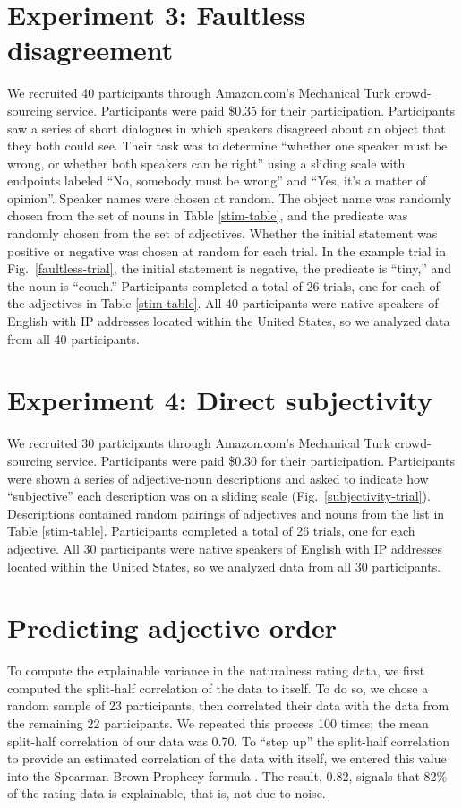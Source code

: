 \documentclass{pnastwo}
\begin{document}
\begin{article}
\begin{materials}
\section{Experiment 3: Faultless disagreement}
We recruited 40 participants through Amazon.com's Mechanical Turk crowd-sourcing service. Participants were paid \$0.35 for their participation. Participants saw a series of short dialogues in which speakers disagreed about an object that they both could see.  Their task was to determine ``whether one speaker must be wrong, or whether both speakers can be right'' using a sliding scale with endpoints labeled ``No, somebody must be wrong'' and ``Yes, it's a matter of opinion''. Speaker names were chosen at random. The object name was randomly chosen from the set of nouns in Table \ref{stim-table}, and the predicate was randomly chosen from the set of adjectives. Whether the initial statement was positive or negative was chosen at random for each trial. In the example trial in Fig.~\ref{faultless-trial}, the initial statement is negative, the predicate is ``tiny,'' and the noun is ``couch.'' Participants completed a total of 26 trials, one for each of the adjectives in Table \ref{stim-table}.
All 40 participants were native speakers of English with IP addresses located within the United States, so we analyzed data from all 40 participants.

\section{Experiment 4: Direct subjectivity}
We recruited 30 participants through Amazon.com's Mechanical Turk crowd-sourcing service. Participants were paid \$0.30 for their participation. Participants were shown a series of adjective-noun descriptions and asked to indicate how ``subjective'' each description was on a sliding scale (Fig.~\ref{subjectivity-trial}). Descriptions contained random pairings of adjectives and nouns from the list in Table \ref{stim-table}. Participants completed a total of 26 trials, one for each adjective. All 30 participants were native speakers of English with IP addresses located within the United States, so we analyzed data from all 30 participants.

\section{Predicting adjective order}
To compute the explainable variance in the naturalness rating data, we first computed the split-half correlation of the data to itself. To do so, we chose a random sample of 23 participants, then correlated their data with the data from the remaining 22 participants. We repeated this process 100 times; the mean split-half correlation of our data was 0.70. To ``step up'' the split-half correlation to provide an estimated correlation of the data with itself, we entered this value into the Spearman-Brown Prophecy formula \cite{stanley1971}. The result, 0.82, signals that 82\% of the rating data is explainable, that is, not due to noise.


\end{materials}
\end{article}
\end{document}
